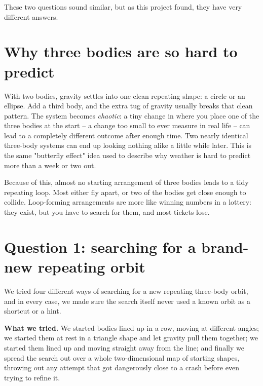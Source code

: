 \documentclass[11pt]{article}
\begin{document}
These two questions sound similar, but as this project found, they have
very different answers.

\section{Why three bodies are so hard to predict}

With two bodies, gravity settles into one clean repeating shape: a circle
or an ellipse. Add a third body, and the extra tug of gravity usually
breaks that clean pattern. The system becomes \emph{chaotic}: a tiny change
in where you place one of the three bodies at the start -- a change too
small to ever measure in real life -- can lead to a completely different
outcome after enough time. Two nearly identical three-body systems can
end up looking nothing alike a little while later. This is the same
"butterfly effect" idea used to describe why weather is hard to predict
more than a week or two out.

Because of this, almost no starting arrangement of three bodies leads to a
tidy repeating loop. Most either fly apart, or two of the bodies get close
enough to collide. Loop-forming arrangements are more like winning
numbers in a lottery: they exist, but you have to search for them, and
most tickets lose.

\section{Question 1: searching for a brand-new repeating orbit}

We tried four different ways of searching for a new repeating three-body
orbit, and in every case, we made sure the search itself never used a
known orbit as a shortcut or a hint.

\textbf{What we tried.} We started bodies lined up in a row, moving at
different angles; we started them at rest in a triangle shape and let
gravity pull them together; we started them lined up and moving straight
away from the line; and finally we spread the search out over a whole
two-dimensional map of starting shapes, throwing out any attempt that got
dangerously close to a crash before even trying to refine it.
\end{document}
